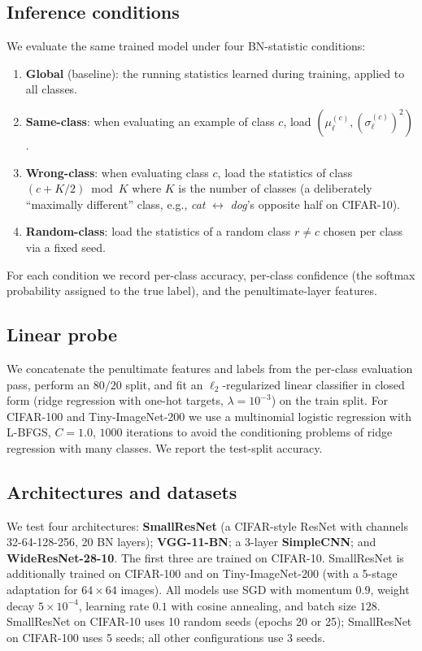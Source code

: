 \documentclass[11pt]{article}
\begin{document}
\subsection{Inference conditions}
We evaluate the same trained model under four BN-statistic conditions:
\begin{enumerate}
\item \textbf{Global} (baseline): the running statistics learned during training, applied to all classes.
\item \textbf{Same-class}: when evaluating an example of class $c$, load $(\mu_\ell^{(c)}, (\sigma_\ell^{(c)})^2)$.
\item \textbf{Wrong-class}: when evaluating class $c$, load the statistics of class $(c + K/2) \bmod K$ where $K$ is the number of classes (a deliberately ``maximally different'' class, e.g., \textit{cat} $\leftrightarrow$ \textit{dog}'s opposite half on CIFAR-10).
\item \textbf{Random-class}: load the statistics of a random class $r \neq c$ chosen per class via a fixed seed.
\end{enumerate}
For each condition we record per-class accuracy, per-class confidence (the softmax probability assigned to the true label), and the penultimate-layer features.

\subsection{Linear probe}
We concatenate the penultimate features and labels from the per-class evaluation pass, perform an $80/20$ split, and fit an $\ell_2$-regularized linear classifier in closed form (ridge regression with one-hot targets, $\lambda = 10^{-3}$) on the train split. For CIFAR-100 and Tiny-ImageNet-200 we use a multinomial logistic regression with L-BFGS, $C=1.0$, $1000$ iterations to avoid the conditioning problems of ridge regression with many classes. We report the test-split accuracy.

\subsection{Architectures and datasets}
We test four architectures: \textbf{SmallResNet} (a CIFAR-style ResNet with channels 32-64-128-256, 20 BN layers); \textbf{VGG-11-BN}; a 3-layer \textbf{SimpleCNN}; and \textbf{WideResNet-28-10}. The first three are trained on CIFAR-10. SmallResNet is additionally trained on CIFAR-100 and on Tiny-ImageNet-200 (with a 5-stage adaptation for $64\times 64$ images). All models use SGD with momentum $0.9$, weight decay $5\times 10^{-4}$, learning rate $0.1$ with cosine annealing, and batch size $128$. SmallResNet on CIFAR-10 uses 10 random seeds (epochs 20 or 25); SmallResNet on CIFAR-100 uses 5 seeds; all other configurations use 3 seeds.
\end{document}
